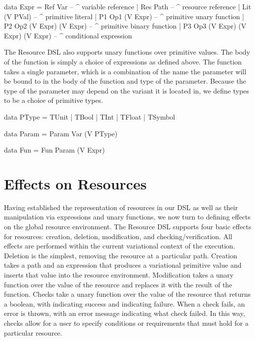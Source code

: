 \documentclass[onehalf,11pt]{beavtex}
\begin{document}
\begin{program}
data Expr
     = Ref Var                             -- ^ variable reference
     | Res Path                            -- ^ resource reference
     | Lit (V PVal)                        -- ^ primitive literal
     | P1  Op1 (V Expr)                    -- ^ primitive unary function
     | P2  Op2 (V Expr) (V Expr)           -- ^ primitive binary function
     | P3 Op3 (V Expr) (V Expr) (V Expr) -- ^ conditional expression
\end{program}

The Resource DSL also supports unary functions over primitive values. The body of the function is simply a choice of expressions as defined above.
The function takes a single parameter, which is a combination of the name the parameter will be bound to in the body of the function and type of the parameter. Because the
type of the parameter may depend on the variant it is located in, we define types to be a choice of primitive types.

\begin{program}
data PType = TUnit | TBool | TInt | TFloat | TSymbol

data Param = Param Var (V PType)

data Fun = Fun Param (V Expr)
\end{program}

\section{Effects on Resources}

Having established the representation of resources in our DSL as well as their manipulation via expressions and unary functions,
we now turn to defining effects on the global resource environment.
The Resource DSL supports four basic effects for resources: creation, deletion, modification, and checking/verification. All effects are performed
within the current variational context of the execution. Deletion is the
simplest, removing the resource at a particular path. Creation takes a path and an expression that produces a variational primitive value
and inserts that value into the resource environment. Modification takes a unary function over the value of the resource and replaces it
with the result of the function. Checks take a unary function over the value of the resource that returns a boolean, with  indicating
success and  indicating failure. When a check fails, an error is thrown, with an error message indicating what check failed.
In this way, checks allow for a user to specify conditions or requirements that must hold for a particular resource.
\end{document}
